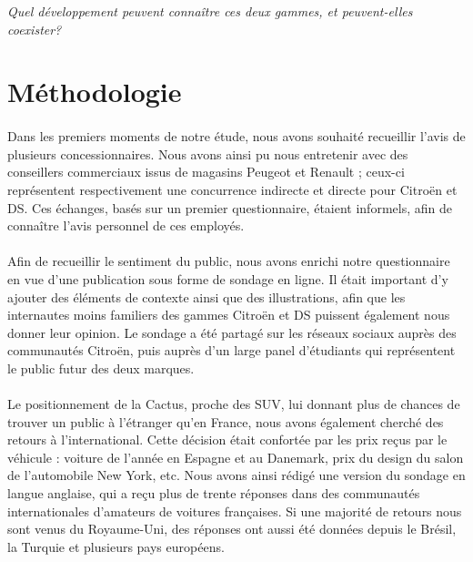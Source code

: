 \documentclass[12pt]{article}\usepackage[]{graphicx}\usepackage[]{color}
\begin{document}
\noindent \emph{Quel développement peuvent connaître ces deux gammes, et
	peuvent-elles coexister?}

\break
\section{Méthodologie}

\paragraph{} Dans les premiers moments de notre étude, nous avons souhaité recueillir
l'avis de plusieurs concessionnaires. Nous avons ainsi pu nous entretenir avec des
conseillers commerciaux issus de magasins Peugeot et Renault ; ceux-ci représentent
respectivement une concurrence indirecte et directe pour Citroën et DS. Ces échanges,
basés sur un premier questionnaire, étaient informels, afin de connaître l'avis personnel
de ces employés.

\paragraph{} Afin de recueillir le sentiment du public, nous avons enrichi notre
questionnaire en vue d'une publication sous forme de sondage en ligne. Il était
important d'y ajouter des éléments de contexte ainsi que des illustrations, afin que
les internautes moins familiers des gammes Citroën et DS puissent également nous donner
leur opinion. Le sondage a été partagé sur les réseaux sociaux auprès des communautés Citroën,
puis auprès d'un large panel d'étudiants qui représentent le public futur des deux marques.

\paragraph{} Le positionnement de la Cactus, proche des SUV, lui donnant plus
de chances de trouver un public à l'étranger qu'en France, nous avons également
cherché des retours à l'international. Cette décision était confortée par les
prix reçus par le véhicule : voiture de l'année en Espagne et au Danemark, prix
du design du salon de l'automobile New York, etc. Nous avons ainsi rédigé une version du
sondage en langue anglaise, qui a reçu plus de trente réponses dans des communautés
internationales d'amateurs de voitures françaises. Si une majorité
de retours nous sont venus du Royaume-Uni, des réponses ont aussi été données
depuis le Brésil, la Turquie et plusieurs pays européens.\\
\end{document}
